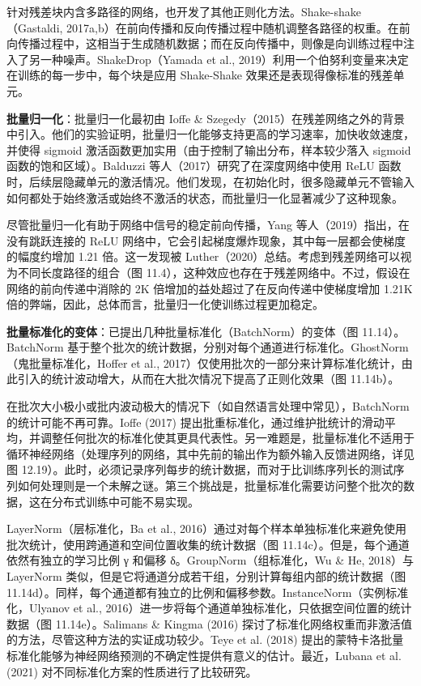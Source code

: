 针对残差块内含多路径的网络，也开发了其他正则化方法。Shake-shake（Gastaldi, 2017a,b）在前向传播和反向传播过程中随机调整各路径的权重。在前向传播过程中，这相当于生成随机数据；而在反向传播中，则像是向训练过程中注入了另一种噪声。ShakeDrop（Yamada et al., 2019）利用一个伯努利变量来决定在训练的每一步中，每个块是应用 Shake-Shake 效果还是表现得像标准的残差单元。

\textbf{批量归一化}：批量归一化最初由 Ioffe & Szegedy（2015）在残差网络之外的背景中引入。他们的实验证明，批量归一化能够支持更高的学习速率，加快收敛速度，并使得 sigmoid 激活函数更加实用（由于控制了输出分布，样本较少落入 sigmoid 函数的饱和区域）。Balduzzi 等人（2017）研究了在深度网络中使用 ReLU 函数时，后续层隐藏单元的激活情况。他们发现，在初始化时，很多隐藏单元不管输入如何都处于始终激活或始终不激活的状态，而批量归一化显著减少了这种现象。

尽管批量归一化有助于网络中信号的稳定前向传播，Yang 等人（2019）指出，在没有跳跃连接的 ReLU 网络中，它会引起梯度爆炸现象，其中每一层都会使梯度的幅度约增加 1.21 倍。这一发现被 Luther（2020）总结。考虑到残差网络可以视为不同长度路径的组合（图 11.4），这种效应也存在于残差网络中。不过，假设在网络的前向传递中消除的 2K 倍增加的益处超过了在反向传递中使梯度增加 1.21K 倍的弊端，因此，总体而言，批量归一化使训练过程更加稳定。

\textbf{批量标准化的变体}：已提出几种批量标准化（BatchNorm）的变体（图 11.14）。BatchNorm 基于整个批次的统计数据，分别对每个通道进行标准化。GhostNorm（鬼批量标准化，Hoffer et al., 2017）仅使用批次的一部分来计算标准化统计，由此引入的统计波动增大，从而在大批次情况下提高了正则化效果（图 11.14b）。

在批次大小极小或批内波动极大的情况下（如自然语言处理中常见），BatchNorm 的统计可能不再可靠。Ioffe (2017) 提出批重标准化，通过维护批统计的滑动平均，并调整任何批次的标准化使其更具代表性。另一难题是，批量标准化不适用于循环神经网络（处理序列的网络，其中先前的输出作为额外输入反馈进网络，详见图 12.19）。此时，必须记录序列每步的统计数据，而对于比训练序列长的测试序列如何处理则是一个未解之谜。第三个挑战是，批量标准化需要访问整个批次的数据，这在分布式训练中可能不易实现。

LayerNorm（层标准化，Ba et al., 2016）通过对每个样本单独标准化来避免使用批次统计，使用跨通道和空间位置收集的统计数据（图 11.14c）。但是，每个通道依然有独立的学习比例 γ 和偏移 δ。GroupNorm（组标准化，Wu & He, 2018）与LayerNorm 类似，但是它将通道分成若干组，分别计算每组内部的统计数据（图 11.14d）。同样，每个通道都有独立的比例和偏移参数。InstanceNorm（实例标准化，Ulyanov et al., 2016）进一步将每个通道单独标准化，只依据空间位置的统计数据（图 11.14e）。Salimans & Kingma (2016) 探讨了标准化网络权重而非激活值的方法，尽管这种方法的实证成功较少。Teye et al. (2018) 提出的蒙特卡洛批量标准化能够为神经网络预测的不确定性提供有意义的估计。最近，Lubana et al. (2021) 对不同标准化方案的性质进行了比较研究。

